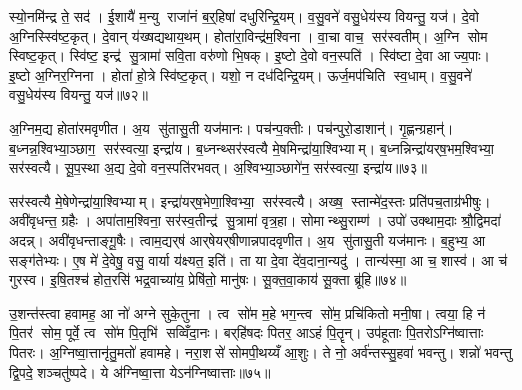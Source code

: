 स्यो॒नमि॑न्द्र ते॒ सद॑। ई॒शायै॑ म॒न्यु राजा॑नं ब॒र्॒हिषा॑ दधुरिन्द्रि॒यम्। व॒सु॒वने॑ वसु॒धेय॑स्य वियन्तु॒ यज॑। दे॒वो अ॒ग्निस्स्वि॑ष्ट॒कृत्। दे॒वान् य॑ख्षद्यथाय॒थम्। होता॑रा॒विन्द्र॑म॒श्विना। वा॒चा वाच॒ सर॑स्वतीम्। अ॒ग्नि सोम स्विष्ट॒कृत्। स्वि॑ष्ट॒ इन्द्र॑ सु॒त्रामा॑ सवि॒ता वरु॑णो भि॒षक्। इ॒ष्टो दे॒वो वन॒स्पति॑। स्वि॑ष्टा दे॒वा आज्य॒पाः। इ॒ष्टो अ॒ग्निर॒ग्निना। होता॑ हो॒त्रे स्वि॑ष्ट॒कृत्। यशो॒ न दध॑दिन्द्रि॒यम्। ऊर्ज॒मप॑चिति स्व॒धाम्। व॒सु॒वने॑ वसु॒धेय॑स्य वियन्तु॒ यज॑॥७२॥\anuvakamend[द्वारो॑ दधुरिन्द्रि॒यव्वँ॑सु॒वने॑ वसु॒धेय॑स्य वियन्तु॒ यज॒ जोष्ट्रीभ्यान्दधुरिन्द्रि॒यव्वँ॑सु॒वने॑ वसु॒धेय॑स्य वियन्तु॒ यज॒ होतृ॑भ्यान्दधुरिन्द्रि॒यव्वँ॑सु॒वने॑ वसु॒धेय॑स्य वियन्तु॒ यजेन्द्रि॒याणि॑ वसु॒वने॑ वसु॒धेय॑स्य वियन्तु॒ यज॒ सर॑स्वत्या॒ वन॒स्पति॒ष्षट्च॑ (दे॒वं ब॒र्॒हिर्दे॒वीर्द्वारो॑ दे॒वी उ॒षासा॑व॒श्विना॑ दे॒वी जोष्ट्री॑ दे॒वी ऊ॒र्जाहु॑ती दे॒वा दे॒वानां भि॒षजा॑ वषट्का॒रैर्दे॒वीस्ति॒स्रस्ति॒स्रो दे॒वीर्दे॒व इन्द्रो॒ नरा॒शसो॑ दे॒व इन्द्रो॒ वन॒स्पति॑र्दे॒वं ब॒र्॒हिर्वारि॑तीनान्दे॒वो अ॒ग्निस्स्वि॑ष्ट॒कृद्दे॒वान्। स॒मिधा॒ऽग्निन्दे॒वं ब॒र्॒हिस्सर॑स्वत्य॒श्विना॒ सर्व॑ वियन्तु। द्वार॑स्ति॒स्रस्सर्व॑वियन्तु। अ॒ज इन्द्र॒मोजो॒ऽग्निं पर॒ सर॑स्वतीम्। नक्तं॒ पूर्व॒ सर॑स्वति। अ॒न्यत्र॒ सर॑स्वती। भि॒षक्पूर्व॑न्दुह इन्द्रि॒यम्। अ॒न्यत्र॑ दधुरिन्द्रि॒यम्। सौ॒त्रा॒म॒ण्या सु॑तासु॒ती। अ॒ञ्जन्त्य॒यय्यँज॑मानः ॥ )]

अ॒ग्निम॒द्य होता॑रमवृणीत। अ॒य सु॑तासु॒ती यज॑मानः। पच॑न्प॒क्तीः। पच॑न्पुरो॒डाशान्॑। गृ॒ह्णन्ग्रहान्॑। ब॒ध्नन्न॒श्विभ्या॒ञ्छाग॒ सर॑स्वत्या॒ इन्द्रा॑य। ब॒ध्नन्थ्सर॑स्वत्यै मे॒षमिन्द्रा॑या॒श्विभ्याम्। ब॒ध्नन्निन्द्रा॑यर्‌ष॒भम॒श्विभ्या॒ सर॑स्वत्यै। सू॒प॒स्था अ॒द्य दे॒वो वन॒स्पति॑रभवत्। अ॒श्विभ्या॒ञ्छागे॑न॒ सर॑स्वत्या॒ इन्द्रा॑य॥७३॥

सर॑स्वत्यै मे॒षेणेन्द्रा॑या॒श्विभ्याम्। इन्द्रा॑यर्‌ष॒भेणा॒श्विभ्या॒ सर॑स्वत्यै। अख्ष॒ स्तान्मे॑द॒स्तः प्रति॑पच॒ताग्र॑भीषुः। अवी॑वृधन्त॒ ग्रहैः। अपा॑ताम॒श्विना॒ सर॑स्व॒तीन्द्र॑ सु॒त्रामा॑ वृत्र॒हा। सोमान्थ्सु॒राम्ण॑। उपो॑ उक्थाम॒दाः श्रौ॒द्विमदा॑ अदन्न्। अवी॑वृधन्ताङ्गू॒षैः। त्वाम॒द्यर्‌ष॑ आर्‌षेयर्‌षीणान्नपादवृणीत। अ॒य सु॑तासु॒ती यज॑मानः। ब॒हुभ्य॒ आ सङ्ग॑तेभ्यः। ए॒ष मे॑ दे॒वेषु॒ वसु॒ वार्या य॑क्ष्यत॒ इति॑। ता या दे॒वा दे॑व॒दाना॒न्यदु॑। तान्य॑स्मा॒ आ च॒ शास्व॑। आ च॑ गुरस्व। इ॒षि॒तश्च॑ होत॒रसि॑ भद्र॒वाच्या॑य॒ प्रेषि॑तो॒ मानु॑षः। सू॒क्त॒वा॒काय॑ सू॒क्ता ब्रू॑हि॥७४॥\anuvakamend[इन्द्रा॑य॒ यज॑मानस्स॒प्त च॑]

उ॒शन्त॑स्त्वा हवामह॒ आ नो॑ अग्ने सुके॒तुना। त्व सो॑म म॒हे भग॒न्त्व सो॑म॒ प्रचि॑कितो मनी॒षा। त्वया॒ हि न॑ पि॒तर॑ सोम॒ पूर्वे॒ त्व सो॑म पि॒तृभि॑ सव्विँदा॒नः। बर्‌हि॑षदः पितर॒ आऽहं पि॒तॄन्। उप॑हूताः पि॒तरोऽग्नि॑ष्वात्ताः पितरः। अ॒ग्निष्वा॒त्तानृ॑तु॒मतो॑ हवामहे। नरा॒शसे॑ सोमपी॒थय्यँ आ॒शुः। ते नो॒ अर्व॑न्तस्सु॒हवा॑ भवन्तु। शन्नो॑ भवन्तु द्वि॒पदे॒ शञ्चतु॑ष्पदे। ये अ॑ग्निष्वा॒त्ता येऽन॑ग्निष्वात्ताः॥७५॥

